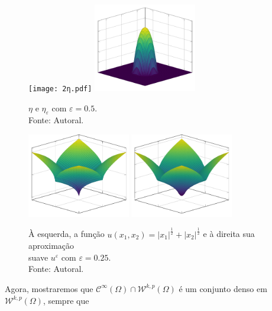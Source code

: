 \documentclass[a4paper, 11pt]{book}
\theoremstyle{definition}
\newcommand{\cC}{\mathcal{C}}
\newcommand{\cW}{\mathcal{W}}
\begin{document}
\begin{ex}
    \begin{figure}
        \centering
        \texttt{[image: 2η.pdf]}
        \hspace{10mm}
        \includegraphics[width=0.4\textwidth]{2ηε.pdf}
        \caption{$\eta$ e $\eta_\varepsilon$ com $\varepsilon = 0.5$.\\Fonte: Autoral.}
        \label{fig:eta-R2}
    \end{figure}

    \begin{figure}
        \centering
        \includegraphics[width=0.4\textwidth]{u.pdf}
        \hspace{10mm}
        \includegraphics[width=0.4\textwidth]{uε2.pdf}
        \caption{À esquerda, a função $u(x_1,x_2) = |x_1|^{\frac{1}{2}} + |x_2|^{\frac{1}{2}}$ e à direita sua aproximação\\suave $u^\varepsilon$ com $\varepsilon = 0.25$.\\Fonte: Autoral.}
        \label{fig:aproximacao-suave-R2}
    \end{figure}
\end{ex}

Agora, mostraremos que $\cC^{\infty}(\Omega) \cap \cW^{k,p}(\Omega)$ é um conjunto denso em $\cW^{k,p}(\Omega)$, sempre que 
\end{document}
